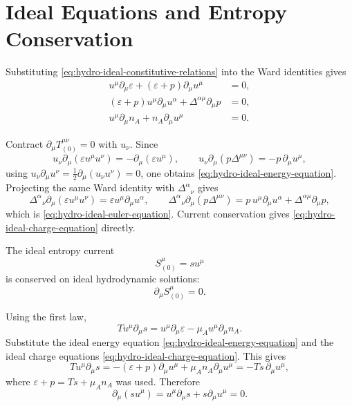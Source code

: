 \section{Ideal Equations and Entropy Conservation}

\begin{remark}
\label{rem:ideal-hydro-equations}
Substituting \eqref{eq:hydro-ideal-constitutive-relations} into the Ward
identities gives
\begin{align}
  u^\mu\partial_\mu\varepsilon
  +(\varepsilon+p)\partial_\mu u^\mu&=0,
  \label{eq:hydro-ideal-energy-equation}\\
  (\varepsilon+p)u^\mu\partial_\mu u^\alpha
  +\Delta^{\alpha\mu}\partial_\mu p&=0,
  \label{eq:hydro-ideal-euler-equation}\\
  u^\mu\partial_\mu n_A+n_A\partial_\mu u^\mu&=0 .
  \label{eq:hydro-ideal-charge-equation}
\end{align}

Contract \(\partial_\mu T^{\mu\nu}_{(0)}=0\) with \(u_\nu\).  Since
\[
  u_\nu\partial_\mu(\varepsilon u^\mu u^\nu)
  =
  -\partial_\mu(\varepsilon u^\mu),
  \qquad
  u_\nu\partial_\mu(p\Delta^{\mu\nu})
  =
  -p\,\partial_\mu u^\mu,
\]
using \(u_\nu\partial_\mu u^\nu=\frac12\partial_\mu(u_\nu u^\nu)=0\), one
obtains \eqref{eq:hydro-ideal-energy-equation}.  Projecting the same Ward
identity with \(\Delta^\alpha{}_\nu\) gives
\[
  \Delta^\alpha{}_\nu\partial_\mu(\varepsilon u^\mu u^\nu)
  =
  \varepsilon u^\mu\partial_\mu u^\alpha,
  \qquad
  \Delta^\alpha{}_\nu\partial_\mu(p\Delta^{\mu\nu})
  =
  p\,u^\mu\partial_\mu u^\alpha+\Delta^{\alpha\mu}\partial_\mu p,
\]
which is \eqref{eq:hydro-ideal-euler-equation}.  Current conservation gives
\eqref{eq:hydro-ideal-charge-equation} directly.
\end{remark}

\begin{remark}
\label{rem:ideal-entropy-conservation}
The ideal entropy current
\[
  S^\mu_{(0)}=s u^\mu
\]
is conserved on ideal hydrodynamic solutions:
\[
  \partial_\mu S^\mu_{(0)}=0.
\]

Using the first law,
\[
  T u^\mu\partial_\mu s
  =
  u^\mu\partial_\mu\varepsilon
  -\mu_A u^\mu\partial_\mu n_A .
\]
Substitute the ideal energy equation
\eqref{eq:hydro-ideal-energy-equation} and the ideal charge equations
\eqref{eq:hydro-ideal-charge-equation}.  This gives
\[
  T u^\mu\partial_\mu s
  =
  -(\varepsilon+p)\partial_\mu u^\mu
  +\mu_A n_A\partial_\mu u^\mu
  =
  -Ts\,\partial_\mu u^\mu,
\]
where \(\varepsilon+p=Ts+\mu_A n_A\) was used.  Therefore
\[
  \partial_\mu(su^\mu)
  =
  u^\mu\partial_\mu s+s\partial_\mu u^\mu=0.
\]
\end{remark}

